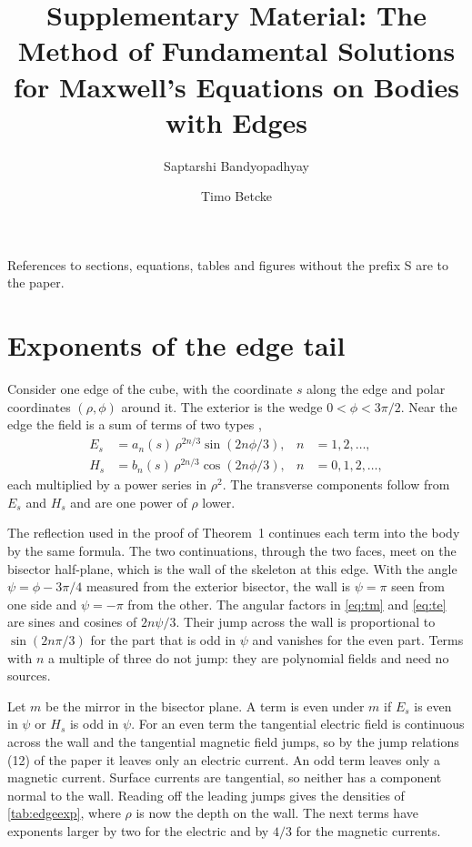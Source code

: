 \documentclass[preprint,11pt]{elsarticle}
\begin{document}
\begin{frontmatter}
\title{Supplementary Material: The Method of Fundamental Solutions for Maxwell's Equations on Bodies with Edges}
\author{Saptarshi Bandyopadhyay}
\author{Timo Betcke}
\end{frontmatter}

References to sections, equations, tables and figures without the prefix S are to the paper.

\section{Exponents of the edge tail}
\label{sup:edge}

Consider one edge of the cube, with the coordinate $s$ along the edge and polar coordinates $(\rho,\phi)$ around it. The exterior is the wedge $0<\phi<3\pi/2$. Near the edge the field is a sum of terms of two types \cite{meixner1972,costabel2000},
\begin{align}
  E_s &= a_n(s)\,\rho^{2n/3}\sin(2n\phi/3), & n &= 1,2,\dots, \label{eq:tm}\\
  H_s &= b_n(s)\,\rho^{2n/3}\cos(2n\phi/3), & n &= 0,1,2,\dots, \label{eq:te}
\end{align}
each multiplied by a power series in $\rho^2$. The transverse components follow from $E_s$ and $H_s$ and are one power of $\rho$ lower.

The reflection used in the proof of Theorem~1 continues each term into the body by the same formula. The two continuations, through the two faces, meet on the bisector half-plane, which is the wall of the skeleton at this edge. With the angle $\psi = \phi - 3\pi/4$ measured from the exterior bisector, the wall is $\psi = \pi$ seen from one side and $\psi = -\pi$ from the other. The angular factors in \eqref{eq:tm} and \eqref{eq:te} are sines and cosines of $2n\psi/3$. Their jump across the wall is proportional to $\sin(2n\pi/3)$ for the part that is odd in $\psi$ and vanishes for the even part. Terms with $n$ a multiple of three do not jump: they are polynomial fields and need no sources.

Let $m$ be the mirror in the bisector plane. A term is even under $m$ if $E_s$ is even in $\psi$ or $H_s$ is odd in $\psi$. For an even term the tangential electric field is continuous across the wall and the tangential magnetic field jumps, so by the jump relations (12) of the paper it leaves only an electric current. An odd term leaves only a magnetic current. Surface currents are tangential, so neither has a component normal to the wall. Reading off the leading jumps gives the densities of \autoref{tab:edgeexp}, where $\rho$ is now the depth on the wall. The next terms have exponents larger by two for the electric and by $4/3$ for the magnetic currents.
\end{document}
